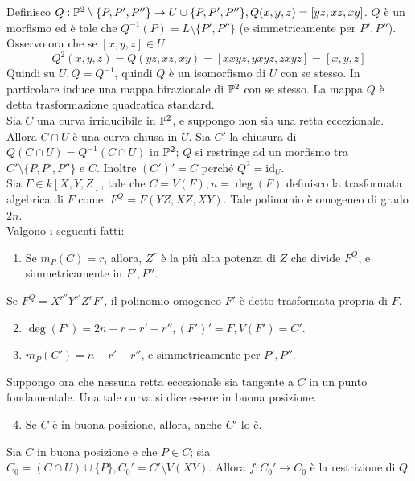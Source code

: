     Definisco $Q : \P^2 \setminus \{P,P',P''\} \to U \cup \{P,P',P''\}, Q(x,y,z) = [yz,xz,xy]$. $Q$ è un morfismo ed è tale che $Q^{-1}(P) = L \setminus \{P',P''\}$ (e simmetricamente per $P',P''$).\\
    Osservo ora che se $[x,y,z] \in U$: \begin{equation*}
        Q^2(x,y,z) = Q(yz,xz,xy) = [xxyz,yxyz,zxyz] = [x,y,z]
    \end{equation*}
    Quindi su $U, Q = Q^{-1}$, quindi $Q$ è un isomorfismo di $U$ con se stesso. In particolare induce una mappa birazionale di $\P^2$ con se stesso. La mappa $Q$ è detta trasformazione quadratica standard.\\
    Sia $C$ una curva irriducibile in $\P^2$, e suppongo non sia una retta eccezionale. Allora $C \cap U$ è una curva chiusa in $U$. Sia $C'$ la chiusura di $Q(C \cap U) = Q^{-1}(C \cap U)$ in $\P^2$; $Q$ si restringe ad un morfismo tra $C' \setminus \{P,P',P''\}$ e $C$. Inoltre $(C')' = C$ 
    perché $Q^2 = \text{id}_U$.\\
    Sia $F \in k[X,Y,Z]$, tale che $C = V(F), n = \deg(F)$ definisco la trasformata algebrica di $F$ come: $F^Q = F(YZ,XZ,XY)$. Tale polinomio è omogeneo di grado $2n$.\\
    Valgono i seguenti fatti: \begin{enumerate}
        \item Se $m_P(C) = r$, allora, $Z^r$ è la più alta potenza di $Z$ che divide $F^Q$, e simmetricamente in $P',P''$. \\
    \end{enumerate}
    Se $F^Q = X^{r''}Y^{r'}Z^rF'$, il polinomio omogeneo $F'$ è detto trasformata propria di $F$. \begin{enumerate} \setcounter{enumi}{1}
        \item $\deg(F') = 2n - r - r' - r'', (F')' = F, V(F') = C'$.
        \item $m_P(C') = n - r' - r''$, e simmetricamente per $P',P''$.
    \end{enumerate}
    Suppongo ora che nessuna retta eccezionale sia tangente a $C$ in un punto fondamentale. Una tale curva si dice essere in buona posizione.
    \begin{enumerate}\setcounter{enumi}{3}
        \item Se $C$ è in buona posizione, allora, anche $C'$ lo è. \\
    \end{enumerate}
    Sia $C$ in buona posizione e che $P \in C$; sia $C_0 = (C \cap U) \cup \{P\}, C_0' = C' \setminus V(XY)$. Allora $f : C_0' \to C_0$ è la restrizione di $Q$
